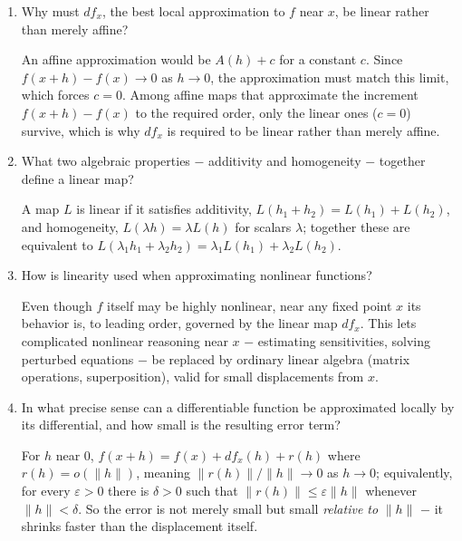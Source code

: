 \documentclass{essay}
\begin{document}
\begin{enumerate}[resume, leftmargin=*, itemsep=8pt]

\item Why must \(df_x\), the best local approximation to \(f\) near \(x\), be linear rather than merely affine?
\begin{answer}
An affine approximation would be \(A(h)+c\) for a constant \(c\). Since \(f(x+h)-f(x)\to0\) as \(h\to0\), the approximation must match this limit, which forces \(c=0\). Among affine maps that approximate the increment \(f(x+h)-f(x)\) to the required order, only the linear ones (\(c=0\)) survive, which is why \(df_x\) is required to be linear rather than merely affine.
\end{answer}

\item What two algebraic properties \(-\) additivity and homogeneity \(-\) together define a linear map?
\begin{answer}
A map \(L\) is linear if it satisfies additivity, \(L(h_1+h_2)=L(h_1)+L(h_2)\), and homogeneity, \(L(\lambda h)=\lambda L(h)\) for scalars \(\lambda\); together these are equivalent to \(L(\lambda_1h_1+\lambda_2h_2)=\lambda_1L(h_1)+\lambda_2L(h_2)\).
\end{answer}

\item How is linearity used when approximating nonlinear functions?
\begin{answer}
Even though \(f\) itself may be highly nonlinear, near any fixed point \(x\) its behavior is, to leading order, governed by the linear map \(df_x\). This lets complicated nonlinear reasoning near \(x\) \(-\) estimating sensitivities, solving perturbed equations \(-\) be replaced by ordinary linear algebra (matrix operations, superposition), valid for small displacements from \(x\).
\end{answer}

\item In what precise sense can a differentiable function be approximated locally by its differential, and how small is the resulting error term?
\begin{answer}
For \(h\) near \(0\), \(f(x+h)=f(x)+df_x(h)+r(h)\) where \(r(h)=o(\|h\|)\), meaning \(\|r(h)\|/\|h\|\to0\) as \(h\to0\); equivalently, for every \(\varepsilon>0\) there is \(\delta>0\) such that \(\|r(h)\|\le\varepsilon\|h\|\) whenever \(\|h\|<\delta\). So the error is not merely small but small \emph{relative to} \(\|h\|\) \(-\) it shrinks faster than the displacement itself.
\end{answer}


\end{enumerate}
\end{document}
